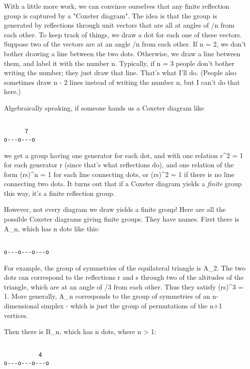 With a little more work, we can convince ourselves that any finite
reflection group is captured by a "Coxeter diagram".  The
idea is that the group is generated by reflections through unit
vectors that are all at angles of \pi /n from each other.  To keep
track of things, we draw a dot for each one of these vectors.  Suppose
two of the vectors are at an angle \pi /n from each other.  If n = 2,
we don't bother drawing a line between the two dots.  Otherwise, we
draw a line between them, and label it with the number n.  Typically,
if n = 3 people don't bother writing the number; they just draw that
line.  That's what I'll do.  (People also sometimes draw n - 2 lines
instead of writing the number n, but I can't do that here.)

Algebraically speaking, if someone hands us a Coxeter diagram like


\begin{verbatim}

      7
o---o---o
\end{verbatim}
    

we get a group having one generator for each dot, and with one
relation r^{2} = 1 for each generator r (since that's what
reflections do), and one relation of the form (rs)^{n} = 1 for
each line connecting dots, or (rs)^{2} = 1 if there is no line
connecting two dots.  It turns out that if a Coxeter diagram yields a
\emph{finite} group this way, it's a finite reflection group.

However, not every diagram we draw yields a finite group!  Here are
all the possible Coxeter diagrams giving finite groups.  They
have names.  First there is A_{n}, which has n dots like this:


\begin{verbatim}

o---o---o---o
\end{verbatim}
    

For example, the group of symmetries of the equilateral triangle is
A_{2}.  The two dots can correspond to the reflections r and s
through two of the altitudes of the triangle, which are at an angle of
\pi /3 from each other.  Thus they satisfy (rs)^{3} = 1.  
More generally,
A_{n} corresponds to the group of symmetries of an
n-dimensional simplex - which is just the group of permutations of
the n+1 vertices.

Then there is B_{n}, which has n dots, where n > 1:


\begin{verbatim}

          4
o---o---o---o
\end{verbatim}
    

